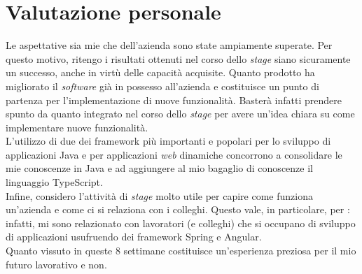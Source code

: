 \section{Valutazione personale}
Le aspettative sia mie che dell'azienda sono state ampiamente superate. Per
questo motivo, ritengo i risultati ottenuti nel corso dello \textit{stage} siano
sicuramente un successo, anche in virtù delle capacità acquisite. Quanto
prodotto ha migliorato il \textit{software} già in possesso all'azienda
e costituisce un punto di partenza per l'implementazione di nuove funzionalità.
Basterà infatti prendere spunto da quanto integrato nel corso dello
\textit{stage} per avere un'idea chiara su come implementare nuove
funzionalità. \\
L'utilizzo di due dei \gls{framework} più importanti e popolari per lo sviluppo
di applicazioni Java e per applicazioni \textit{web} dinamiche concorrono a
consolidare le mie conoscenze in Java e ad aggiungere al mio bagaglio di
conoscenze il linguaggio TypeScript.  \\
Infine, considero l'attività di \textit{stage} molto utile per capire come
funziona un'azienda e come ci si relaziona con i colleghi. Questo vale, in
particolare, per \myCompany: infatti, mi sono relazionato con lavoratori (e
colleghi) che si occupano di sviluppo di applicazioni usufruendo dei
\gls{framework} Spring e Angular.\\
Quanto vissuto in queste 8 settimane costituisce un'esperienza
preziosa per il mio futuro lavorativo e non.